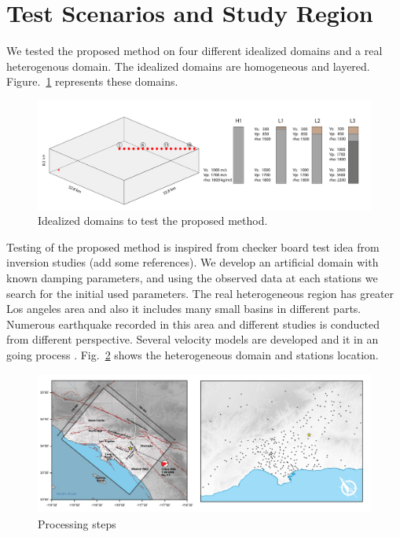 \section{ Test Scenarios and Study Region}

We tested the proposed method on four different idealized domains and a real heterogenous domain. The idealized domains are homogeneous and layered. Figure.~\ref{fig:3d_domain_scenarios}  represents these domains. 

 \begin{figure}[ht]
    \centering
    \includegraphics[width=\textwidth]{figures/pdf/3d_domain_scenarios.pdf}
    \caption{Idealized domains to test the proposed method.}
    \label{fig:3d_domain_scenarios}
\end{figure}

Testing of the proposed method is inspired from checker board test idea from inversion studies (add some references). We develop an artificial domain with  known damping parameters, and using the observed data at each stations we search for the initial used parameters. The real heterogeneous region  has greater Los angeles area and also it includes many small basins in different parts. Numerous earthquake recorded in this area and different studies is conducted from different perspective.  Several velocity models are developed and it in an going process \citep[e.g., see][]{small2017scec}. Fig.~\ref{fig:Figure_stations} shows the  heterogeneous domain and stations location. 

 \begin{figure}[ht]
    \centering
    \includegraphics[width=\textwidth]{figures/pdf/Figure_stations.pdf}
    \caption{Processing steps}
    \label{fig:Figure_stations}
\end{figure}


